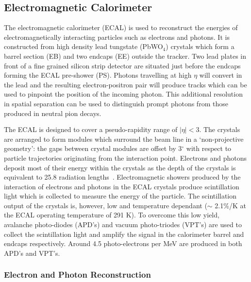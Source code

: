 \subsection{Electromagnetic Calorimeter}
The electromagnetic calorimeter (ECAL) is used to reconstruct the energies of electromagnetically 
interacting particles such as electrons and photons. 
It is constructed from high density lead tungstate (PbWO$_{4}$) crystals which
form a barrel section (EB) and two endcaps (EE) outside the tracker. 
Two lead plates in front of a fine grained silicon strip detector are situated just before the 
endcaps forming the ECAL pre-shower (PS). 
Photons travelling at high $\eta$ will convert in the lead and the resulting electron-positron pair
will produce tracks which can be used to pinpoint the position of the incoming photon. This additional
resolution in spatial separation can be used to distinguish prompt photons from those produced
in neutral pion decays.

The ECAL is designed to cover a pseudo-rapidity range of $|\eta | < 3$. 
The crystals are arranged to form modules which surround the beam line in a `non-projective geometry':
the gaps between crystal modules are offset by 3$^{\circ}$ with respect to particle trajectories originating from 
the interaction point. Electrons and photons deposit most of their energy within 
the crystals as the depth of the crystals is equivalent to 25.8 radiation lengths~\citep{TDR1}. 
Electromagnetic showers produced by the interaction of electrons and photons in the ECAL crystals
produce scintillation light which is collected to measure the energy of the particle. 
The scintillation output of the crystals is, however, low and temperature dependant 
($\sim$ 2.1\%/K at the ECAL operating temperature of 291 K). 
To overcome this low yield, avalanche photo-diodes (APD's) and vacuum 
photo-triodes (VPT's) are used to collect the scintillation light and amplify the signal in the 
calorimeter barrel and endcaps respectively. Around 4.5 photo-electrons per MeV are produced in both 
APD's and VPT's. 

\subsubsection{Electron and Photon Reconstruction}

